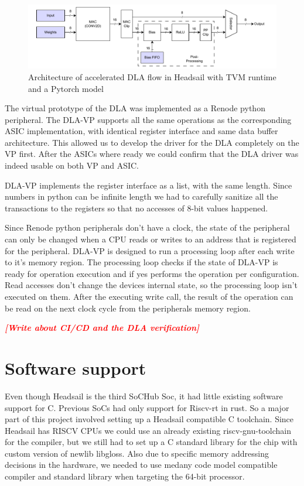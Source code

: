 \documentclass[12pt,a4paper,english
]{tunithesis}
\newcommand{\fixthis}[1]{\textbf{\textit{\textcolor{red}{[#1]}}}}
\begin{document}
\begin{figure}
  \centering
  \includegraphics[width=\linewidth]{img/dla-internal.pdf}
  \caption{Architecture of accelerated DLA flow in Headsail with TVM runtime and a Pytorch model}
  \label{fig:dla_internal}
\end{figure}


The virtual prototype of the DLA was implemented as a Renode python peripheral. The DLA-VP supports all the same operations as the corresponding ASIC implementation, with identical register interface and same data buffer architecture. This allowed us to develop the driver for the DLA completely on the VP first. After the ASICs where ready we could confirm that the DLA driver was indeed usable on both VP and ASIC.

DLA-VP implements the register interface as a list, with the same length. Since numbers in python can be infinite length we had to carefully sanitize all the transactions to the registers so that no accesses of 8-bit values happened.

Since Renode python peripherals don't have a clock, the state of the peripheral can only be changed when a CPU reads or writes to an address that is registered for the peripheral. DLA-VP is designed to run a processing loop after each write to it's memory region. The processing loop checks if the state of DLA-VP is ready for operation execution and if yes performs the operation per configuration. Read accesses don't change the devices internal state, so the processing loop isn't executed on them. After the executing write call, the result of the operation can be read on the next clock cycle from the peripherals memory region.

\fixthis{Write about CI/CD and the DLA verification}

\section{Software support}
\label{sec:software_support}
Even though Headsail is the third SoCHub Soc, it had little existing software support for C. Previous SoCs had only support for Riscv-rt in rust. So a major part of this project involved setting up a Headsail compatible C toolchain. Since Headsail has RISCV CPUs we could use an already existing riscv-gnu-toolchain for the compiler, but we still had to set up a C standard library for the chip with custom version of newlib libgloss. Also due to specific memory addressing decisions in the hardware, we needed to use medany code model compatible compiler and standard library when targeting the 64-bit processor.
\end{document}
